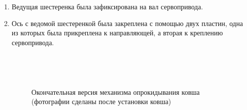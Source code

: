 \begin{enumerate}
\begin{enumerate}
      \item Ведущая шестеренка была зафиксирована на вал сервопривода.
      
      \item Ось с ведомой шестеренкой была закреплена с помощью двух пластин, одна из которых была прикреплена к направляющей, а вторая к креплению сервопривода.
      \begin{figure}[H]
      	\begin{minipage}[h]{0.47\linewidth}
      	\end{minipage}
      	\hfill
      	\begin{minipage}[h]{0.47\linewidth}
      	\end{minipage}
      	\vfill
      	\begin{minipage}[h]{0.2\linewidth}
      		\center  
      	\end{minipage}
      	\begin{minipage}[h]{0.6\linewidth}
      		\caption{Окончательная версия механизма опрокидывания ковша (фотографии сделаны после установки ковша)}
      	\end{minipage}
      \end{figure}
      	      

\end{enumerate}
\end{enumerate}

